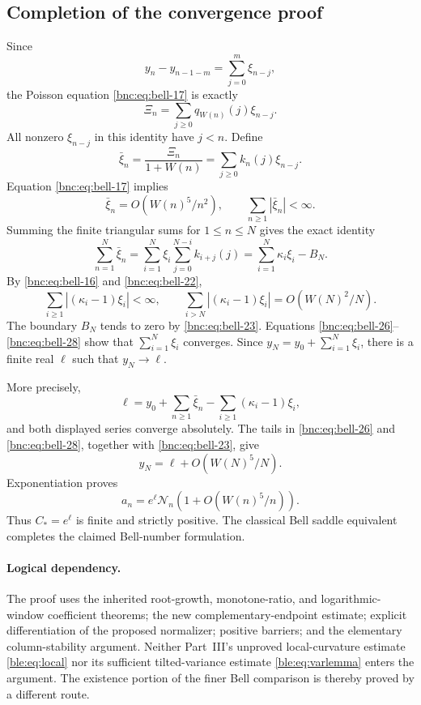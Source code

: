 \documentclass[11pt]{article}
\numberwithin{equation}{section}
\theoremstyle{definition}
\theoremstyle{remark}
\begin{document}
\subsection{Completion of the convergence proof}

Since
\[
 y_n-y_{n-1-m}=\sum_{j=0}^{m}\xi_{n-j},
\]
the Poisson equation \eqref{bnc:eq:bell-17} is exactly
\[
 \Xi_n=\sum_{j\ge0}q_{W(n)}(j)\xi_{n-j}.
\]
All nonzero \(\xi_{n-j}\) in this identity have \(j<n\).
Define
\[
 \bar\xi_n=\frac{\Xi_n}{1+W(n)}
     =\sum_{j\ge0}k_n(j)\xi_{n-j}.
\]
Equation \eqref{bnc:eq:bell-17} implies
\begin{equation}\label{bnc:eq:bell-26}
\bar\xi_n=O(W(n)^5/n^2),\qquad \sum_{n\ge1}|\bar\xi_n|<\infty.
\end{equation}
Summing the finite triangular sums for \(1\le n\le N\) gives the
exact identity
\begin{equation}\label{bnc:eq:bell-27}
\sum_{n=1}^{N}\bar\xi_n
 =\sum_{i=1}^{N}\xi_i
       \sum_{j=0}^{N-i}k_{i+j}(j)
 =\sum_{i=1}^{N}\kappa_i \xi_i-B_N.
\end{equation}
By \eqref{bnc:eq:bell-16} and \eqref{bnc:eq:bell-22},
\begin{equation}\label{bnc:eq:bell-28}
\sum_{i\ge1}|(\kappa_i-1)\xi_i|
   <\infty,
 \qquad
 \sum_{i>N}|(\kappa_i-1)\xi_i|
     =O(W(N)^2/N).
\end{equation}
The boundary \(B_N\) tends to zero by \eqref{bnc:eq:bell-23}.
Equations \eqref{bnc:eq:bell-26}--\eqref{bnc:eq:bell-28} show that
\(\sum_{i=1}^{N}\xi_i\) converges.
Since \(y_N=y_0+\sum_{i=1}^{N}\xi_i\), there is a finite real
\(\ell\) such that \(y_N\to\ell\).

More precisely,
\[
 \ell
 =y_0+\sum_{n\ge1}\bar\xi_n
        -\sum_{i\ge1}(\kappa_i-1)\xi_i,
\]
and both displayed series converge absolutely.
The tails in \eqref{bnc:eq:bell-26} and \eqref{bnc:eq:bell-28}, together with \eqref{bnc:eq:bell-23}, give
\[
 y_N=\ell+O(W(N)^5/N).
\]
Exponentiation proves
\[
 a_n=e^\ell\mathcal N_n
       \left(1+O(W(n)^5/n)\right).
\]
Thus \(C_*=e^\ell\) is finite and strictly positive.
The classical Bell saddle equivalent completes the claimed
Bell-number formulation.

\paragraph{Logical dependency.}
The proof uses the inherited root-growth, monotone-ratio, and
logarithmic-window coefficient theorems; the new complementary-endpoint
estimate; explicit differentiation of the proposed normalizer; positive
barriers; and the elementary column-stability argument.
Neither Part~III's unproved local-curvature estimate \eqref{ble:eq:local}
nor its sufficient tilted-variance estimate \eqref{ble:eq:varlemma}
enters the argument.
The existence portion of the finer Bell comparison is thereby proved by
a different route.
\end{document}
